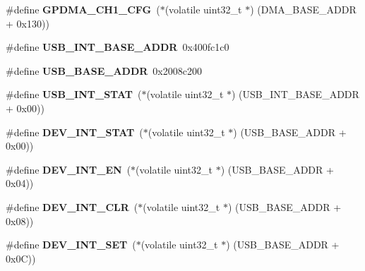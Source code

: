 \begin{DoxyCompactItemize}
\item 
\mbox{\label{group__lpc24xx__regs_gaf8c841ee078009780c64007aaa94bfde}} 
\#define {\bfseries G\+P\+D\+M\+A\+\_\+\+C\+H1\+\_\+\+C\+FG}~($\ast$(volatile uint32\+\_\+t $\ast$) (D\+M\+A\+\_\+\+B\+A\+S\+E\+\_\+\+A\+D\+DR + 0x130))
\item 
\mbox{\label{group__lpc24xx__regs_ga440a41938a33d63a7f589e141e526c1c}} 
\#define {\bfseries U\+S\+B\+\_\+\+I\+N\+T\+\_\+\+B\+A\+S\+E\+\_\+\+A\+D\+DR}~0x400fc1c0
\item 
\mbox{\label{group__lpc24xx__regs_gac4a0aaeb144366d66f6a9f937e090f79}} 
\#define {\bfseries U\+S\+B\+\_\+\+B\+A\+S\+E\+\_\+\+A\+D\+DR}~0x2008c200
\item 
\mbox{\label{group__lpc24xx__regs_ga3f71dda0c54b4515a69b141211ca7789}} 
\#define {\bfseries U\+S\+B\+\_\+\+I\+N\+T\+\_\+\+S\+T\+AT}~($\ast$(volatile uint32\+\_\+t $\ast$) (U\+S\+B\+\_\+\+I\+N\+T\+\_\+\+B\+A\+S\+E\+\_\+\+A\+D\+DR + 0x00))
\item 
\mbox{\label{group__lpc24xx__regs_ga0b22893868cac9fe1ebec9e277af6dda}} 
\#define {\bfseries D\+E\+V\+\_\+\+I\+N\+T\+\_\+\+S\+T\+AT}~($\ast$(volatile uint32\+\_\+t $\ast$) (U\+S\+B\+\_\+\+B\+A\+S\+E\+\_\+\+A\+D\+DR + 0x00))
\item 
\mbox{\label{group__lpc24xx__regs_ga5cfcbf267f741f81fded5a5db4170878}} 
\#define {\bfseries D\+E\+V\+\_\+\+I\+N\+T\+\_\+\+EN}~($\ast$(volatile uint32\+\_\+t $\ast$) (U\+S\+B\+\_\+\+B\+A\+S\+E\+\_\+\+A\+D\+DR + 0x04))
\item 
\mbox{\label{group__lpc24xx__regs_gaab3308f395f5b9027ce79ff8c0b51d33}} 
\#define {\bfseries D\+E\+V\+\_\+\+I\+N\+T\+\_\+\+C\+LR}~($\ast$(volatile uint32\+\_\+t $\ast$) (U\+S\+B\+\_\+\+B\+A\+S\+E\+\_\+\+A\+D\+DR + 0x08))
\item 
\mbox{\label{group__lpc24xx__regs_gab3c27fe79244d35e511570f0a95c68b6}} 
\#define {\bfseries D\+E\+V\+\_\+\+I\+N\+T\+\_\+\+S\+ET}~($\ast$(volatile uint32\+\_\+t $\ast$) (U\+S\+B\+\_\+\+B\+A\+S\+E\+\_\+\+A\+D\+DR + 0x0\+C))
\item 

\end{DoxyCompactItemize}
